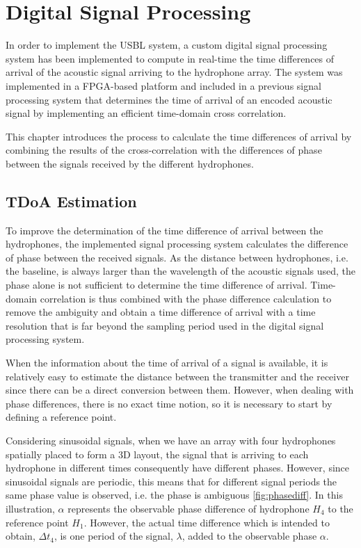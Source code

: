 \chapter{Digital Signal Processing } \label{chap:hdl}

In order to implement the USBL system, a custom digital signal processing system has been implemented to compute in real-time the time differences of arrival of the acoustic signal arriving to the hydrophone array. The system was implemented in a FPGA-based platform and included in a previous signal processing system that determines the time of arrival of an encoded acoustic signal by implementing an efficient time-domain cross correlation. 

This chapter introduces the process to calculate the time differences of arrival by combining the results of the cross-correlation with the differences of phase between the signals received by the different hydrophones.

\section{TDoA Estimation}

To improve the determination of the time difference of arrival between the hydrophones, the implemented signal processing system calculates the difference of phase between the received signals. As the distance between hydrophones, i.e. the baseline, is always larger than the wavelength of the acoustic signals used, the phase alone is not sufficient to determine the time difference of arrival. Time-domain correlation is thus combined with the phase difference calculation to remove the ambiguity and obtain a time difference of arrival with a time resolution that is far beyond the sampling period used in the digital signal processing system.

When the information about the time of arrival of a signal is available, it is relatively easy to estimate the distance between the transmitter and the receiver since there can be a direct conversion between them. However, when dealing with phase differences, there is no exact time notion, so it is necessary to start by defining a reference point. 

Considering sinusoidal signals, when we have an array with four hydrophones spatially placed to form a 3D layout, the signal that is arriving to each  hydrophone in different times consequently have different phases. However, since sinusoidal signals are periodic, this means that for different signal periods the same phase value is observed, i.e. the phase is ambiguous \ref{fig:phasediff}. In this illustration, $\alpha$ represents the observable phase difference of hydrophone $H_4$ to the reference point $H_1$. However, the actual time difference which is intended to obtain, $\Delta t_4$, is one period of the signal, $\lambda$, added to the observable phase $\alpha$.

